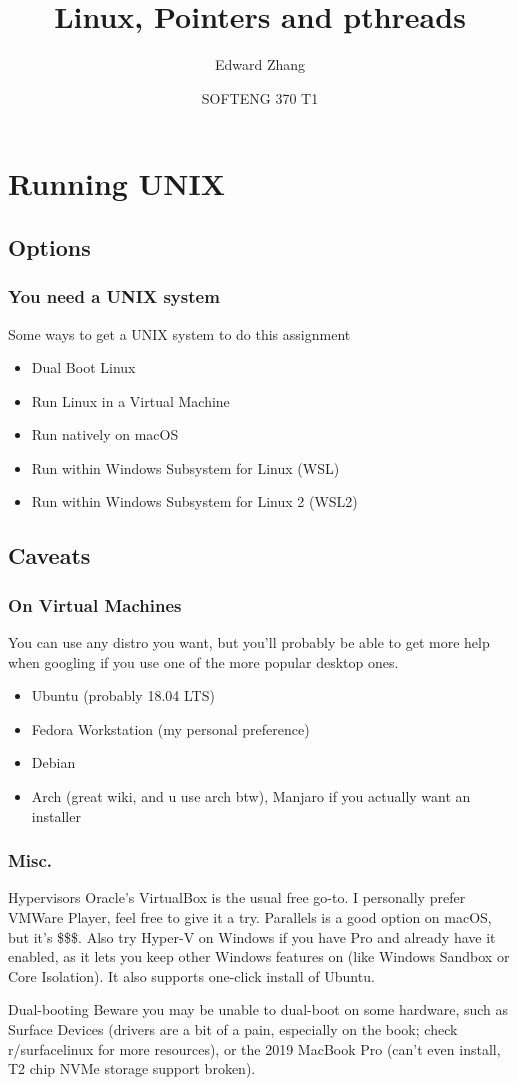 \documentclass{beamer}
\title[SOFTENG 370 Tutorial 1 (2019)] %
{Linux, Pointers and pthreads}
\author{Edward Zhang}
\date[July 2019] %
{SOFTENG 370 T1}
\begin{document}
\frame{\titlepage}
\section{Running UNIX}
\subsection{Options}
\begin{frame}
  \frametitle{You need a UNIX system}
  Some ways to get a UNIX system to do this assignment
  \begin{itemize}
    \item Dual Boot Linux
    \item Run Linux in a Virtual Machine
    \item Run natively on macOS
    \item Run within Windows Subsystem for Linux (WSL)
    \item Run within Windows Subsystem for Linux 2 (WSL2)
  \end{itemize}
\end{frame}
\subsection{Caveats}
\begin{frame}
  \frametitle{On Virtual Machines}
  You can use any distro you want, but you'll probably be able to get more help when googling if you use one of the more popular desktop ones.
  \begin{itemize}
    \item Ubuntu (probably 18.04 LTS)
    \item Fedora Workstation (my personal preference)
    \item Debian
    \item Arch (great wiki, and u use arch btw), Manjaro if you actually want an installer
  \end{itemize}
\end{frame}
\begin{frame}
  \frametitle{Misc.}
  \begin{block}{Hypervisors}
    Oracle's VirtualBox is the usual free go-to. I personally prefer VMWare Player, feel free to give it a try. Parallels is a good option on macOS, but it's \$\$\$. Also try Hyper-V on Windows if you have Pro and already have it enabled, as it lets you keep other Windows features on (like Windows Sandbox or Core Isolation). It also supports one-click install of Ubuntu.
  \end{block}
  \begin{block}{Dual-booting}
    Beware you may be unable to dual-boot on some hardware, such as Surface Devices (drivers are a bit of a pain, especially on the book; check r/surfacelinux for more resources), or the 2019 MacBook Pro (can't even install, T2 chip NVMe storage support broken).
  \end{block}
\end{frame}
\end{document}
